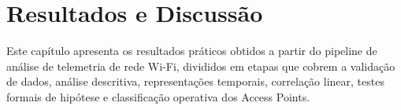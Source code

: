 \chapter{Resultados e Discussão}
\label{cap:resultados}

Este capítulo apresenta os resultados práticos obtidos a partir do pipeline de análise de telemetria de rede Wi-Fi, divididos em etapas que cobrem a validação de dados, análise descritiva, representações temporais, correlação linear, testes formais de hipótese e classificação operativa dos Access Points.







